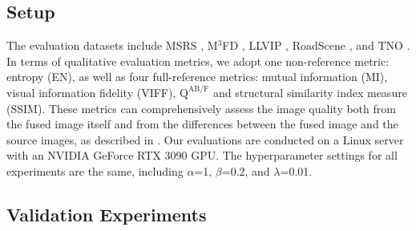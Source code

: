 \subsection{Setup}
The evaluation datasets include MSRS \cite{msrs}, M$^3$FD \cite{tardal}, LLVIP \cite{llvip}, RoadScene \cite{road}, and TNO \cite{tno}. 
In terms of qualitative evaluation metrics, we adopt one non-reference metric: entropy (EN), as well as four full-reference metrics: mutual information (MI), visual information fidelity (VIFF),  $\mathrm{Q^{AB/F}}$ and structural similarity index measure (SSIM). 
These metrics can comprehensively assess the image quality both from the fused image itself and from the differences between the fused image and the source images, as described in \cite{metrics}. 
Our evaluations are conducted on a Linux server with an NVIDIA GeForce RTX 3090 GPU.
The hyperparameter settings for all experiments are the same, including $\alpha$=1, $\beta$=0.2, and $\lambda$=0.01. 


\subsection{Validation Experiments}
